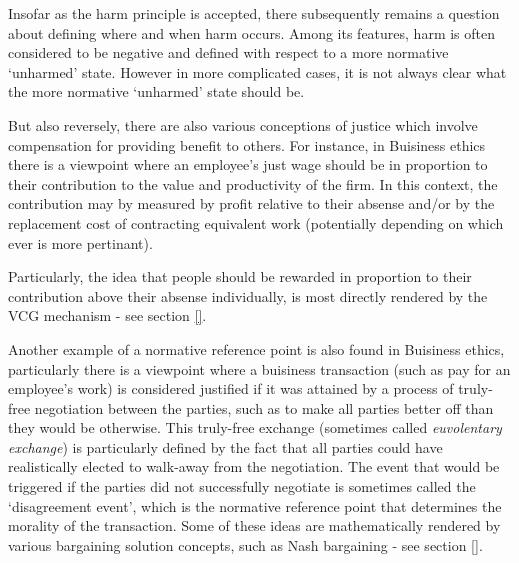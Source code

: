 Insofar as the harm principle is accepted, there subsequently remains a question about defining where and when harm occurs.
Among its features, harm is often considered to be negative and defined with respect to a more normative `unharmed' state.
However in more complicated cases, it is not always clear what the more normative `unharmed' state should be.%

But also reversely, there are also various conceptions of justice which involve compensation for providing benefit to others.
For instance, in Buisiness ethics there is a viewpoint where an employee's just wage should be in proportion to their contribution to the value and productivity of the firm.\cite{sternberg2000just}
In this context, the contribution may by measured by profit relative to their absense and/or by the replacement cost of contracting equivalent work (potentially depending on which ever is more pertinant).

Particularly, the idea that people should be rewarded in proportion to their contribution above their absense individually, is most directly rendered by the VCG mechanism - see section \ref{}.


Another example of a normative reference point is also found in Buisiness ethics, particularly there is a viewpoint where a buisiness transaction (such as pay for an employee's work) is considered justified if it was attained by a process of truly-free negotiation between the parties, such as to make all parties better off than they would be otherwise.\cite{ExecutiveCompensationUnjustorJustRight} 
This truly-free exchange (sometimes called \textit{euvolentary exchange}) is particularly defined by the fact that all parties could have realistically elected to walk-away from the negotiation.\cite{Guzman2019}
The event that would be triggered if the parties did not successfully negotiate is sometimes called the `disagreement event', which is the normative reference point that determines the morality of the transaction.
Some of these ideas are mathematically rendered by various bargaining solution concepts, such as Nash bargaining - see section \ref{}.


